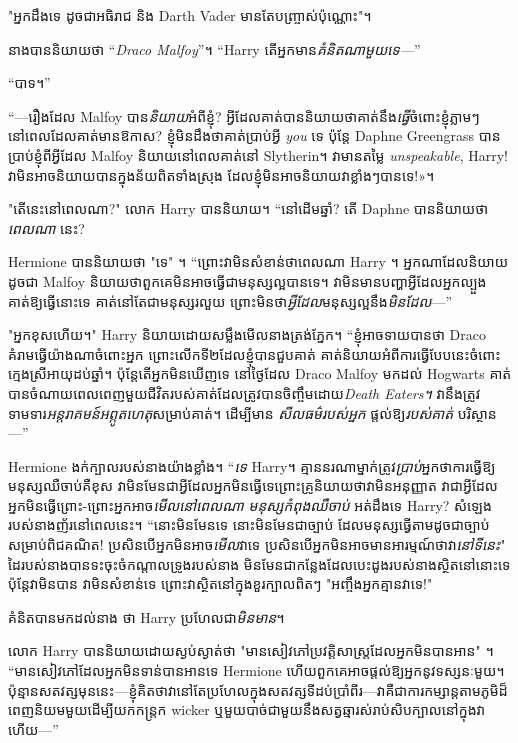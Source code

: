 {{{{{{"អ្នកដឹងទេ ដូចជាអធិរាជ និង Darth Vader មានតែបញ្ច្រាស់ប៉ុណ្ណោះ"។

នាងបាននិយាយថា “\emph{Draco Malfoy}”។ “Harry តើអ្នកមាន\emph{គំនិតណាមួយទេ—}”

“បាទ។”

“—រឿងដែល Malfoy បាន\emph{និយាយ}អំពីខ្ញុំ? អ្វីដែលគាត់បាននិយាយថាគាត់នឹង\emph{ធ្វើ}ចំពោះខ្ញុំភ្លាមៗនៅពេលដែលគាត់មានឱកាស? ខ្ញុំមិនដឹងថាគាត់ប្រាប់អ្វី \emph{you} ទេ ប៉ុន្តែ Daphne Greengrass បានប្រាប់ខ្ញុំពីអ្វីដែល Malfoy និយាយនៅពេលគាត់នៅ Slytherin។ វាមានតម្លៃ \emph{unspeakable}, Harry! វា​មិន​អាច​និយាយ​បាន​ក្នុង​ន័យ​ពិត​ទាំង​ស្រុង ដែល​ខ្ញុំ​មិន​អាច​និយាយ​វា​ខ្លាំងៗ​បាន​ទេ!»។

"តើនេះនៅពេលណា?" លោក Harry បាននិយាយ។ “នៅដើមឆ្នាំ? តើ Daphne បាននិយាយថា \emph{ពេលណា} នេះ?

Hermione បាននិយាយថា "ទេ" ។ “ព្រោះវាមិនសំខាន់ថាពេលណា Harry ។ អ្នក​ណា​ដែល​និយាយ​ដូច​ជា Malfoy និយាយ​ថា​ពួក​គេ​មិន​អាច​ធ្វើ​ជា​មនុស្ស​ល្អ​បាន​ទេ។ វាមិនមានបញ្ហាអ្វីដែលអ្នកល្បួងគាត់ឱ្យធ្វើនោះទេ គាត់នៅតែជាមនុស្សរលួយ ព្រោះមិនថា\emph{អ្វីដែល}មនុស្សល្អនឹង\emph{មិនដែល}—”

"អ្នកខុសហើយ។" Harry និយាយដោយសម្លឹងមើលនាងត្រង់ភ្នែក។ “ខ្ញុំអាចទាយបានថា Draco គំរាមធ្វើយ៉ាងណាចំពោះអ្នក ព្រោះលើកទី២ដែលខ្ញុំបានជួបគាត់ គាត់និយាយអំពីការធ្វើបែបនេះចំពោះក្មេងស្រីអាយុដប់ឆ្នាំ។ ប៉ុន្តែតើអ្នកមិនឃើញទេ នៅថ្ងៃដែល Draco Malfoy មកដល់ Hogwarts គាត់បានចំណាយពេលពេញមួយជីវិតរបស់គាត់ដែលត្រូវបានចិញ្ចឹមដោយ\emph{Death Eaters។} វានឹងត្រូវទាមទារ\emph{អន្តរាគមន៍អព្ភូតហេតុ}សម្រាប់គាត់។ ដើម្បីមាន \emph{សីលធម៌របស់អ្នក} ផ្តល់ឱ្យ\emph{របស់គាត់} បរិស្ថាន—”

Hermione ងក់ក្បាលរបស់នាងយ៉ាងខ្លាំង។ “\emph{ទេ} Harry។ គ្មាននរណាម្នាក់ត្រូវ\emph{ប្រាប់}អ្នកថាការធ្វើឱ្យមនុស្សឈឺចាប់គឺខុស វាមិនមែនជាអ្វីដែលអ្នកមិនធ្វើទេព្រោះគ្រូនិយាយថាវាមិនអនុញ្ញាត វាជាអ្វីដែលអ្នកមិនធ្វើព្រោះ-ព្រោះអ្នកអាច\emph{មើលនៅពេលណា មនុស្ស​កំពុង​ឈឺ​ចាប់} អត់​ដឹង​ទេ Harry? សំឡេងរបស់នាងញ័រនៅពេលនេះ។ “នោះមិនមែនទេ នោះមិនមែនជាច្បាប់ \emph{} ដែលមនុស្សធ្វើតាមដូចជាច្បាប់សម្រាប់ពិជគណិត! ប្រសិនបើអ្នកមិនអាច\emph{មើល}វាទេ ប្រសិនបើអ្នកមិនអាចមានអារម្មណ៍ថាវា\emph{នៅទីនេះ}" ដៃរបស់នាងបានទះចុះចំកណ្តាលទ្រូងរបស់នាង មិនមែនជាកន្លែងដែលបេះដូងរបស់នាងស្ថិតនៅនោះទេ ប៉ុន្តែវាមិនបាន វាមិនសំខាន់ទេ ព្រោះវាស្ថិតនៅក្នុងខួរក្បាលពិតៗ "អញ្ចឹងអ្នកគ្មានវាទេ!"

គំនិតបានមកដល់នាង ថា Harry ប្រហែលជា\emph{មិនមាន}។

លោក Harry បាននិយាយដោយស្ងប់ស្ងាត់ថា "មានសៀវភៅប្រវត្តិសាស្ត្រដែលអ្នកមិនបានអាន" ។ “មានសៀវភៅដែលអ្នកមិនទាន់បានអានទេ Hermione ហើយពួកគេអាចផ្តល់ឱ្យអ្នកនូវទស្សនៈមួយ។ ប៉ុន្មានសតវត្សមុននេះ—ខ្ញុំគិតថាវានៅតែប្រហែលក្នុងសតវត្សទីដប់ប្រាំពីរ—វាគឺជាការកម្សាន្តតាមភូមិដ៏ពេញនិយមមួយដើម្បីយកកន្ត្រក wicker ឬមួយបាច់ជាមួយនឹងសត្វឆ្មារស់រាប់សិបក្បាលនៅក្នុងវា ហើយ—”

}}}}}}
